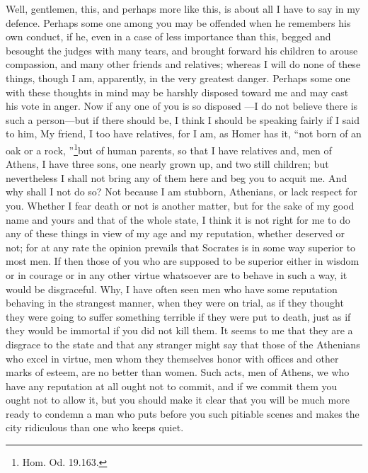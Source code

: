 Well, gentlemen, this, and perhaps more like this, is about all I have to say in my defence. Perhaps some one among you may be offended  when he remembers his own conduct, if he, even in a case of less importance than this, begged and besought the judges with many tears, and brought forward his children to arouse compassion, and many other friends and relatives; whereas I will do none of these things, though I am, apparently, in the very greatest danger. Perhaps some one with these thoughts in mind may be harshly disposed toward me and may cast his vote in anger. Now if any one of you is so disposed  —I do not believe there is such a person—but if there should be, I think I should be speaking fairly if I said to him, My friend, I too have relatives, for I am, as Homer has it, “not born of an oak or a rock,
”\footnote{Hom. Od. 19.163.}but of human parents, so that I have relatives and, men of Athens, I have three sons, one nearly grown up, and two still children; but nevertheless I shall not bring any of them here and beg you to acquit me. And why shall I not do so? Not because I am stubborn, Athenians,  or lack respect for you. Whether I fear death or not is another matter, but for the sake of my good name and yours and that of the whole state, I think it is not right for me to do any of these things in view of my age and my reputation, whether deserved or not; for at any rate the opinion prevails that Socrates  is in some way superior to most men. If then those of you who are supposed to be superior either in wisdom or in courage or in any other virtue whatsoever are to behave in such a way, it would be disgraceful. Why, I have often seen men who have some reputation behaving in the strangest manner, when they were on trial, as if they thought they were going to suffer something terrible if they were put to death, just as if they would be immortal if you did not kill them. It seems to me that they are a disgrace to the state and that any stranger might say that those of the Athenians who excel  in virtue, men whom they themselves honor with offices and other marks of esteem, are no better than women. Such acts, men of Athens, we who have any reputation at all ought not to commit, and if we commit them you ought not to allow it, but you should make it clear that you will be much more ready to condemn a man who puts before you such pitiable scenes and makes the city ridiculous than one who keeps quiet.

